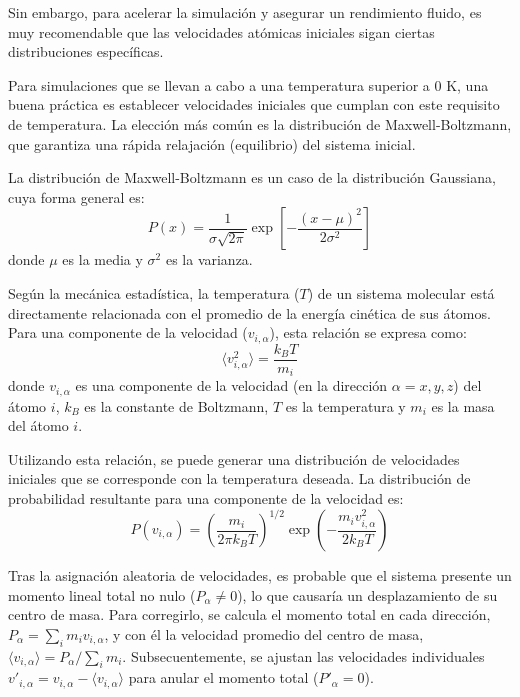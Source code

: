 Sin embargo, para acelerar la simulación y asegurar un rendimiento fluido, es muy recomendable que las velocidades atómicas iniciales sigan ciertas distribuciones específicas.

Para simulaciones que se llevan a cabo a una temperatura superior a 0 K, una buena práctica es establecer velocidades iniciales que cumplan con este requisito de temperatura. La elección más común es la distribución de Maxwell-Boltzmann, que garantiza una rápida relajación (equilibrio) del sistema inicial.

La distribución de Maxwell-Boltzmann es un caso de la distribución Gaussiana, cuya forma general es:
\begin{equation}
    P(x) = \frac{1}{\sigma\sqrt{2\pi}} \exp\left[-\frac{(x-\mu)^2}{2\sigma^2}\right]
\end{equation}
donde $\mu$ es la media y $\sigma^2$ es la varianza.


Según la mecánica estadística, la temperatura ($T$) de un sistema molecular está directamente relacionada con el promedio de la energía cinética de sus átomos. Para una componente de la velocidad ($v_{i,\alpha}$), esta relación se expresa como:
\begin{equation}
    \langle v_{i,\alpha}^2 \rangle = \frac{k_B T}{m_i}
\end{equation}
donde $v_{i,\alpha}$ es una componente de la velocidad (en la dirección $\alpha = x, y, z$) del átomo $i$, $k_B$ es la constante de Boltzmann, $T$ es la temperatura y $m_i$ es la masa del átomo $i$.

Utilizando esta relación, se puede generar una distribución de velocidades iniciales que se corresponde con la temperatura deseada. La distribución de probabilidad resultante para una componente de la velocidad es:
\begin{equation}
    P(v_{i,\alpha}) = \left(\frac{m_i}{2\pi k_B T}\right)^{1/2} \exp\left(-\frac{m_i v_{i,\alpha}^2}{2 k_B T}\right)
\end{equation}


Tras la asignación aleatoria de velocidades, es probable que el sistema presente un momento lineal total no nulo ($P_{\alpha} \neq 0$), lo que causaría un desplazamiento de su centro de masa. Para corregirlo, se calcula el momento total en cada dirección, $P_{\alpha} = \sum_i m_i v_{i, \alpha}$, y con él la velocidad promedio del centro de masa, $\langle v_{i, \alpha} \rangle = P_{\alpha} / \sum_i m_i$. Subsecuentemente, se ajustan las velocidades individuales $v'_{i, \alpha} = v_{i, \alpha} - \langle v_{i, \alpha} \rangle$ para anular el momento total ($P'_{\alpha} = 0$).

